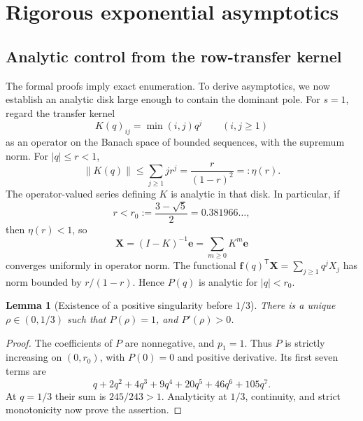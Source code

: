 \documentclass[11pt,letterpaper]{article}
\numberwithin{equation}{section}
\newtheorem{lemma}[theorem]{Lemma}
\theoremstyle{definition}
\newcommand{\opnorm}[1]{\left\lVert#1\right\rVert}
\begin{document}
\section{Rigorous exponential asymptotics}
\label{sec:asymptotics}

\subsection{Analytic control from the row-transfer kernel}
The formal proofs imply exact enumeration. To derive asymptotics, we now
establish an analytic disk large enough to contain the dominant pole.
For $s=1$, regard the transfer kernel
\[
 K(q)_{ij}=\min(i,j)q^j\qquad(i,j\ge1)
\]
as an operator on the Banach space of bounded sequences, with the supremum
norm. For $|q|\le r<1$,
\begin{equation}
 \opnorm{K(q)}\le\sum_{j\ge1}jr^j=\frac{r}{(1-r)^2}=:\eta(r).
 \label{eq:kernelbound}
\end{equation}
The operator-valued series defining $K$ is analytic in that disk. In
particular, if
\begin{equation}
 r<r_0:=\frac{3-\sqrt5}{2}=0.381966\ldots,
 \label{eq:rzero}
\end{equation}
then $\eta(r)<1$, so
\[
 \mathbf X=(I-K)^{-1}\mathbf e=\sum_{m\ge0}K^m\mathbf e
\]
converges uniformly in operator norm. The functional
$\mathbf f(q)^{\mathsf T}\mathbf X=\sum_{j\ge1}q^jX_j$ has norm bounded
by $r/(1-r)$. Hence $P(q)$ is analytic for $|q|<r_0$.

\begin{lemma}[Existence of a positive singularity before $1/3$]
\label{lem:rho}
There is a unique $\rho\in(0,1/3)$ such that $P(\rho)=1$, and
$P'(\rho)>0$.
\end{lemma}
\begin{proof}
The coefficients of $P$ are nonnegative, and $p_1=1$. Thus $P$ is strictly
increasing on $(0,r_0)$, with $P(0)=0$ and positive derivative. Its first
seven terms are
\[
 q+2q^2+4q^3+9q^4+20q^5+46q^6+105q^7.
\]
At $q=1/3$ their sum is $245/243>1$. Analyticity at $1/3$, continuity,
and strict monotonicity now prove the assertion.
\end{proof}
\end{document}
